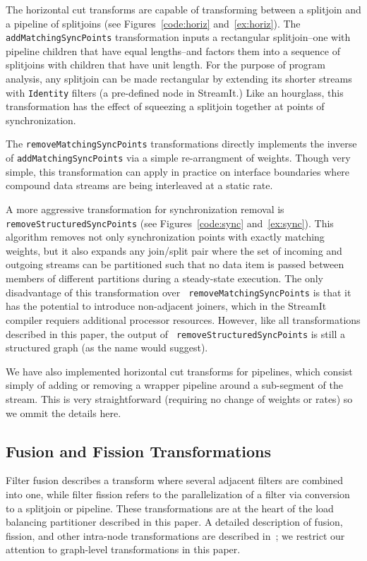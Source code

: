 The horizontal cut transforms are capable of transforming between a
splitjoin and a pipeline of splitjoins (see Figures~\ref{code:horiz}
and~\ref{ex:horiz}).  The {\tt addMatchingSyncPoints} transformation
inputs a rectangular splitjoin--one with pipeline children that have
equal lengths--and factors them into a sequence of splitjoins with
children that have unit length.  For the purpose of program analysis,
any splitjoin can be made rectangular by extending its shorter streams
with {\tt Identity} filters (a pre-defined node in StreamIt.)  Like an
hourglass, this transformation has the effect of squeezing a splitjoin
together at points of synchronization.

The {\tt removeMatchingSyncPoints} transformations directly implements
the inverse of {\tt addMatchingSyncPoints} via a simple re-arrangment
of weights.  Though very simple, this transformation can apply in
practice on interface boundaries where compound data streams are being
interleaved at a static rate.

A more aggressive transformation for synchronization removal is {\tt
removeStructuredSyncPoints} (see Figures~\ref{code:sync}
and~\ref{ex:sync}).  This algorithm removes not only synchronization
points with exactly matching weights, but it also expands any
join/split pair where the set of incoming and outgoing streams can be
partitioned such that no data item is passed between members of
different partitions during a steady-state execution.  The only
disadvantage of this transformation over {\tt
removeMatchingSyncPoints} is that it has the potential to introduce
non-adjacent joiners, which in the StreamIt compiler requiers
additional processor resources.  However, like all transformations
described in this paper, the output of {\tt
removeStructuredSyncPoints} is still a structured graph (as the name
would suggest).

We have also implemented horizontal cut transforms for pipelines,
which consist simply of adding or removing a wrapper pipeline around a
sub-segment of the stream.  This is very straightforward (requiring no
change of weights or rates) so we ommit the details here.

\subsection{Fusion and Fission Transformations}

Filter fusion describes a transform where several adjacent filters are
combined into one, while filter fission refers to the parallelization
of a filter via conversion to a splitjoin or pipeline.  These
transformations are at the heart of the load balancing partitioner
described in this paper.  A detailed description of fusion, fission,
and other intra-node transformations are described
in~\cite{streamit-asplos}; we restrict our attention to graph-level
transformations in this paper.

